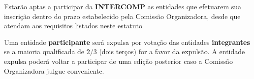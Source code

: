 \begin{article}
	Estarão aptas a participar da \textbf{INTERCOMP} as entidades que efetuarem sua inscrição dentro do prazo estabelecido pela Comissão Organizadora, desde que atendam aos requisitos listados neste estatuto
\end{article}

\begin{article}
	Uma entidade \textbf{participante} será expulsa por votação das entidades \textbf{integrantes} se a maioria qualificada de 2/3 (dois terços) for a favor da expulsão. A entidade expulsa poderá voltar a participar de uma edição posterior caso a Comissão Organizadora julgue conveniente.
\end{article}
